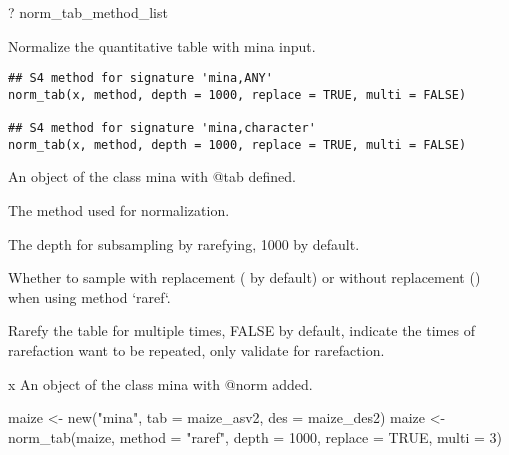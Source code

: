 \documentclass[a4paper]{book}
\begin{document}
%
\begin{SeeAlso}\relax
{}
\end{SeeAlso}
%
\begin{Examples}
\begin{ExampleCode}
? norm_tab_method_list
\end{ExampleCode}
\end{Examples}
%
\begin{Description}\relax
Normalize the quantitative table with mina input.
\end{Description}
%
\begin{Usage}
\begin{verbatim}
## S4 method for signature 'mina,ANY'
norm_tab(x, method, depth = 1000, replace = TRUE, multi = FALSE)

## S4 method for signature 'mina,character'
norm_tab(x, method, depth = 1000, replace = TRUE, multi = FALSE)
\end{verbatim}
\end{Usage}
%
\begin{Arguments}
\begin{ldescription}
\item[\code{x}] An object of the class mina with @tab defined.

\item[\code{method}] The method used for normalization.

\item[\code{depth}] The depth for subsampling by rarefying, 1000 by default.

\item[\code{replace}] Whether to sample with replacement ( by default) or
without replacement () when using method `raref`.

\item[\code{multi}] Rarefy the table for multiple times, FALSE by default, indicate
the times of rarefaction want to be repeated, only validate for rarefaction.
\end{ldescription}
\end{Arguments}
%
\begin{Value}
x An object of the class mina with @norm added.
\end{Value}
%
\begin{Examples}
\begin{ExampleCode}
maize <- new("mina", tab = maize_asv2, des = maize_des2)
maize <- norm_tab(maize, method = "raref", depth = 1000, replace = TRUE,
multi = 3)
\end{ExampleCode}
\end{Examples}
\end{document}
